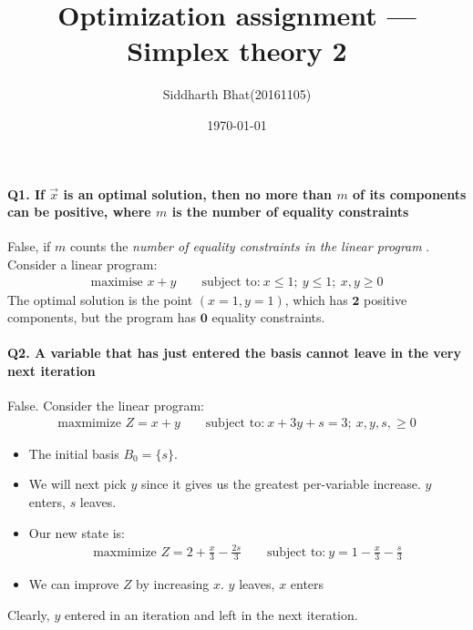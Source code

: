 \documentclass[11pt]{article}
\author{Siddharth Bhat(20161105)}
\title{Optimization assignment --- Simplex theory 2}
\date{\today}
\begin{document}
\maketitle
\thispagestyle{fancy}
\paragraph{Q1. If $\vec x$ is an optimal solution, then no more than $m$ of its components
can be positive, where $m$ is the number of equality constraints}

False, if $m$ counts the \textit{number of equality constraints
in the linear program} . Consider a linear program:
\begin{align*}
\text{maximise $x + y$} \qquad \text{subject to:}~x \leq 1;~y \leq 1;~x, y \geq 0
\end{align*}
The optimal solution is the point $(x = 1, y = 1)$, which has $\mathbf{2}$ 
positive components, but the program has $\mathbf{0}$ equality constraints.

\paragraph{Q2. A variable that has just entered the basis cannot leave in the
very next iteration}
False. Consider the linear program:
\begin{align*}
    \text{maxmimize $Z = x + y$} \qquad \text{subject to:}~x + 3y + s = 3;~x,y,s, \geq 0
\end{align*}
\begin{itemize}
    \item The initial basis $B_0 = \{s\}$. 
    \item We will next pick $y$ since it gives us the greatest
        per-variable increase. $y$ enters, $s$ leaves.
    \item Our new state is:
        \begin{align*}
            \text{maxmimize $Z = 2 + \frac{x}{3} - \frac{2s}{3}$} \qquad \text{subject to:}~y = 1 - \frac{x}{3} - \frac{s}{3}
        \end{align*}
\item We can improve $Z$ by increasing $x$. $y$ leaves, $x$ enters
\end{itemize}
Clearly, $y$ entered in an iteration and left in the next iteration.
\end{document}
